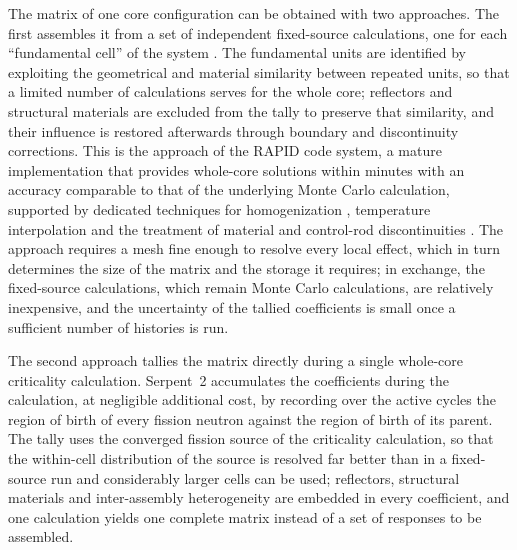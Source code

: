 The matrix of one core configuration can be obtained with two approaches. The first
assembles it from a set of independent fixed-source calculations, one for each
``fundamental cell'' of the system \cite{WaltersNSE2018}. The fundamental units
are identified by exploiting the geometrical and material similarity between
repeated units, so that a limited number of calculations serves for the whole
core; reflectors and structural materials are excluded from the
tally to preserve that similarity, and their influence is restored afterwards
through boundary and discontinuity corrections. This is the approach of the
RAPID code system, a mature implementation that provides whole-core solutions within minutes with
an accuracy comparable to that of the underlying Monte Carlo calculation,
supported by dedicated techniques for homogenization \cite{HePNE2020Homog},
temperature interpolation \cite{HeANE2020Temp} and the treatment of material and
control-rod discontinuities \cite{HeANE2019,HePNE2020,Mascolino2022}. The
approach requires a mesh fine enough to resolve every local effect, which in
turn determines the size of the matrix and the storage it requires; in
exchange, the fixed-source calculations, which remain Monte Carlo calculations,
are relatively inexpensive, and the uncertainty of
the tallied coefficients is small once a sufficient number of histories is run.

The second approach tallies the matrix directly during a single whole-core
criticality calculation. Serpent~2 \cite{LeppanenEPJN2025} accumulates the
coefficients during the calculation, at negligible additional cost, by
recording over the active cycles the region of birth of every fission neutron
against the region of birth of its parent. The tally uses the converged fission
source of the criticality calculation, so that the within-cell distribution of
the source is resolved far better than in a fixed-source run and considerably
larger cells can be used; reflectors, structural materials and inter-assembly
heterogeneity are embedded in every coefficient, and one calculation yields one
complete matrix instead of a set of responses to be assembled.

